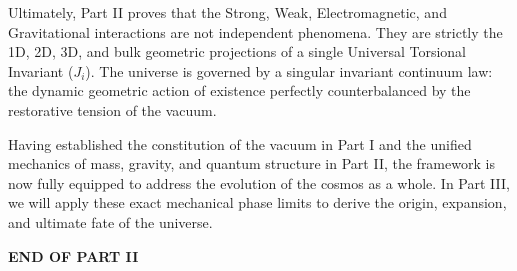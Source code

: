 Ultimately, Part II proves that the Strong, Weak, Electromagnetic, and Gravitational interactions are not independent phenomena. They are strictly the 1D, 2D, 3D, and bulk geometric projections of a single Universal Torsional Invariant ($J_i$). The universe is governed by a singular invariant continuum law: the dynamic geometric action of existence perfectly counterbalanced by the restorative tension of the vacuum.

Having established the constitution of the vacuum in Part I and the unified mechanics of mass, gravity, and quantum structure in Part II, the framework is now fully equipped to address the evolution of the cosmos as a whole. In Part III, we will apply these exact mechanical phase limits to derive the origin, expansion, and ultimate fate of the universe.
\vspace{2cm}
\begin{center}
    \textbf{\Large END OF PART II}
\end{center}